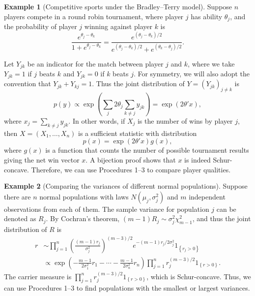 \documentclass[11pt]{article}
\theoremstyle{definition}
\newtheorem{example}{Example}
\theoremstyle{custom}
\begin{document}
\begin{example}[Competitive sports under the Bradley--Terry model]
  Suppose $n$ players compete in a round robin tournament, where player $j$ has ability $\theta_j$, and the probability of player $j$ winning against player $k$ is
$$\frac{e^{\theta_j - \theta_k}}{1 + e^{\theta_j - \theta_k}} = \frac{e^{\left(\theta_j - \theta_k\right) / 2}}{e^{\left(\theta_j - \theta_k\right) / 2} + e^{\left(\theta_k - \theta_j\right) / 2}}.$$

Let $Y_{jk}$ be an indicator for the match between player $j$ and $k$, where we take $Y_{jk} = 1$ if $j$ beats $k$ and $Y_{jk} = 0$ if $k$ beats $j$. For symmetry, we will also adopt the convention that $Y_{jk} + Y_{kj} = 1$. Thus the joint distribution of $Y=\left(Y_{jk}\right)_{j\neq k}$ is
$$p\left(y\right) \propto \exp\left(\sum_j 2\theta_j \sum_{k \ne j} y_{jk}\right)  = \exp\left(2\theta' x\right),$$
where $x_j = \sum_{k \ne j} y_{jk}$. In other words, if $X_j$ is the number of wins by player $j$, then $X=(X_1,\ldots,X_n)$ is a sufficient statistic with distribution
$$p\left(x\right) = \exp\left(2\theta' x\right) g\left(x\right),$$
where $g\left(x\right)$ is a function that counts the number of possible tournament results giving the net win vector $x$. A bijection proof shows that $x$ is indeed Schur-concave. Therefore, we can use Procedures 1--3 to compare player qualities.
\end{example}

\begin{example}[Comparing the variances of different normal populations] Suppose there are $n$ normal populations with laws $N(\mu_j, \sigma_j^2)$ and $m$ independent observations from each of them. The sample variance for population $j$ can be denoted as $R_j$. By Cochran's theorem, $\left(m-1\right) R_j \sim \sigma_j^2 \chi_{m-1}^2$, and thus the joint distribution of $R$ is
\begin{align*}
r & \sim \prod_{j=1}^n \left(\frac{\left(m-1\right) r_j}{\sigma_j^2}\right)^{\left(m-3\right) / 2} e^{-\left(m-1\right) r_j / 2 \sigma_j^2} 1_{\left\{r_j > 0 \right\}} \\
& \propto \exp\left(-\frac{m-1}{2 \sigma_1^2} r_1 - \cdots - \frac{m-1}{2 \sigma_n^2} r_n\right) \prod_{j=1}^n r_j^{\left(m-3\right) / 2} 1_{\left\{r > 0\right\}}.
\end{align*}
The carrier measure is $\prod_{j=1}^n r_j^{\left(m-3\right) / 2} 1_{\left\{r > 0\right\}}$, which is Schur-concave. Thus, we can use Procedures 1--3 to find populations with the smallest or largest variances.
\end{example}
\end{document}
